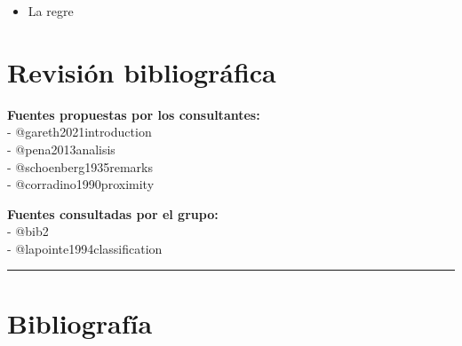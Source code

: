 \documentclass[
  12pt,
]{article}
\providecommand{\tightlist}{%
  \setlength{\itemsep}{0pt}\setlength{\parskip}{0pt}}
\begin{document}
\begin{itemize}
\tightlist
\item
  La regre
\end{itemize}

\section{Revisión bibliográfica}\label{revisiuxf3n-bibliogruxe1fica}

\textbf{Fuentes propuestas por los consultantes:}\\
- @gareth2021introduction\\
- @pena2013analisis\\
- @schoenberg1935remarks\\
- @corradino1990proximity

\textbf{Fuentes consultadas por el grupo:}\\
- @bib2\\
- @lapointe1994classification

\begin{center}\rule{0.5\linewidth}{0.5pt}\end{center}

\section{Bibliografía}\label{bibliografuxeda}
\end{document}
